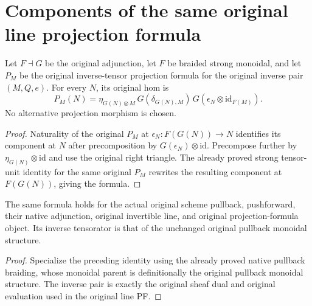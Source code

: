 \section{Components of the same original line projection formula}

\begin{lemma}
\label{lem:line-pf-original-hom-component}
\leanok
Let $F\dashv G$ be the original adjunction, let $F$ be braided strong
monoidal, and let $P_M$ be the original inverse-tensor projection formula
for the original inverse pair $(M,Q,e)$.  For every $N$, its original
hom is
\[
 P_M(N)=\eta_{G(N)\otimes M}\,
   G(\delta_{G(N),M})\,
   G(\epsilon_N\otimes\mathrm{id}_{F(M)}).
\]
No alternative projection morphism is chosen.
\end{lemma}
\begin{proof}
Naturality of the original $P_M$ at $\epsilon_N:F(G(N))\to N$
identifies its component at $N$ after precomposition by
$G(\epsilon_N)\otimes\mathrm{id}$.  Precompose further by
$\eta_{G(N)}\otimes\mathrm{id}$ and use the original right triangle.
The already proved strong tensor-unit identity for the same original
$P_M$ rewrites the resulting component at $F(G(N))$, giving the formula.
\end{proof}

\begin{lemma}
\label{lem:line-pf-native-hom-component}
\leanok
The same formula holds for the actual original scheme pullback,
pushforward, their native adjunction, original invertible line, and
original projection-formula object.  Its inverse tensorator is that of
the unchanged original pullback monoidal structure.
\end{lemma}
\begin{proof}
Specialize the preceding identity using the already proved native
pullback braiding, whose monoidal parent is definitionally the original
pullback monoidal structure.  The inverse pair is exactly the original
sheaf dual and original evaluation used in the original line PF.
\end{proof}
